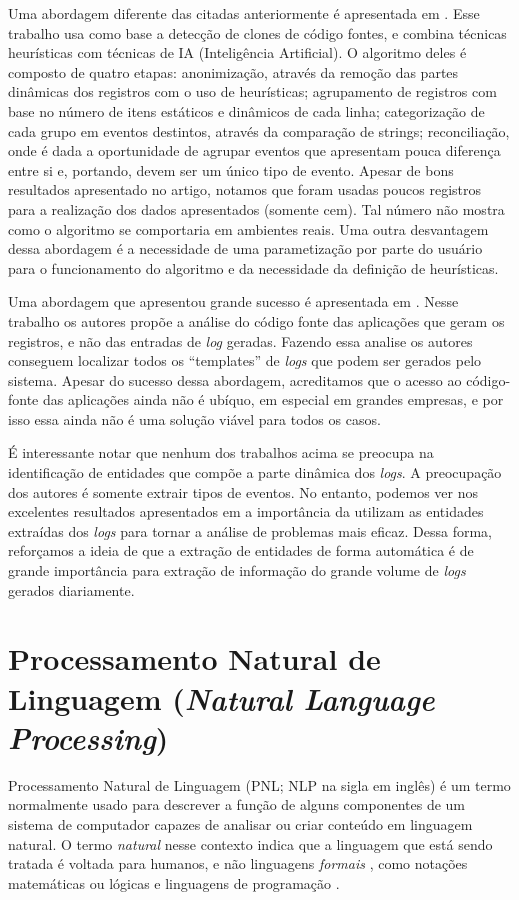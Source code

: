 \documentclass[
	12pt,				%
	openright,			%
	twoside,			%
	a4paper,			%
	english,			%
	spanish,			%
	brazil,				%
	]{abntex2}
\begin{document}
Uma abordagem diferente das citadas anteriormente é apresentada em \cite{jiang2008automated}. Esse trabalho usa como base a detecção de clones de código fontes, e combina técnicas heurísticas com técnicas de IA (Inteligência Artificial).  O algoritmo deles é composto de quatro etapas: anonimização, através da remoção das partes dinâmicas dos registros com o uso de heurísticas; agrupamento de registros com base no número de itens estáticos e dinâmicos de cada linha; categorização de cada grupo em eventos destintos, através da comparação de strings; reconciliação, onde é dada a oportunidade de agrupar eventos que apresentam pouca diferença entre si e, portando, devem ser um único tipo de evento. Apesar de bons resultados apresentado no artigo, notamos que foram usadas poucos registros para a realização dos dados apresentados (somente cem). Tal número não mostra como o algoritmo se comportaria em ambientes reais. Uma outra desvantagem dessa abordagem é a necessidade de uma parametização por parte do usuário para o funcionamento do algoritmo e da necessidade da definição de heurísticas.

Uma abordagem que apresentou grande sucesso é apresentada em \cite{xu2009detecting}. Nesse trabalho os autores propõe a análise do código fonte das aplicações que geram os registros, e não das entradas de \emph{log} geradas. Fazendo essa analise os autores conseguem localizar todos os ``templates'' de \emph{logs} que podem ser gerados pelo sistema. Apesar do sucesso dessa abordagem, acreditamos que o acesso ao código-fonte das aplicações ainda não é ubíquo, em especial em grandes empresas, e por isso essa ainda não é uma solução viável para todos os casos.

É interessante notar que nenhum dos trabalhos acima se preocupa na identificação de entidades que compõe a parte dinâmica dos \emph{logs}. A preocupação dos autores é somente extrair tipos de eventos. No entanto, podemos ver nos excelentes resultados apresentados em \cite{xu2008mining,yen2013beehive} a importância da utilizam as entidades extraídas dos \emph{logs} para tornar a análise de problemas mais eficaz. Dessa forma, reforçamos a ideia de que a extração de entidades de forma automática é de grande importância para extração de informação do grande volume de \emph{logs} gerados diariamente.

\section{Processamento Natural de Linguagem (\emph{Natural Language Processing})}
Processamento Natural de Linguagem (PNL; NLP na sigla em inglês) é um termo normalmente usado para descrever a função de alguns componentes de um sistema de computador capazes de analisar ou criar conteúdo em linguagem natural. O termo \emph{natural} nesse contexto indica que a linguagem que está sendo tratada é voltada para humanos, e não linguagens \emph{formais} , como notações matemáticas ou lógicas e linguagens de programação \cite{jackson2002natural}.
\end{document}
